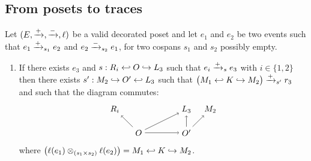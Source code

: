 \subsection{From posets to traces}
%

%


\begin{lemma}
  \label{lem:update_dec}
  Let $(E,\mathrel{\xrightarrow{+}},\mathrel{\xrightarrow{-}},\ell)$ be a valid decorated poset and let $e_1$ and $e_2$ be two events such that $e_1\mathrel{\xrightarrow{+}}_{s_1} e_2$ and $e_2\mathrel{\xrightarrow{-}}_{s_2} e_1$, for two cospans $s_1$ and $s_2$ possibly empty.
  \begin{enumerate}
  \item If there exists $e_3$ and $s:R_i\hookleftarrow O \hookrightarrow L_3$ such that $e_i\mathrel{\xrightarrow{+}}_s e_3$ with $i\in\{1,2\}$ then there exists $s':M_2\hookrightarrow O'\hookleftarrow L_3$ such that $\big( M_1\hookleftarrow K\hookrightarrow M_2\big)\mathrel{\xrightarrow{+}}_{s'} r_3$ and such that the diagram commutes:
    \[
    \begin{tikzpicture} %
      \node (ri) at (-1,1) {\(R_i\)};
      \node (m2) at (3,1) {\(M_2\)};
      \node (l3) at (2,1) {\(L_3\)};
      \node (o) at (0,0) {\(O\)};
      \node (o1) at (2,0) {\(O'\)};
      \draw [->] (o) -- (o1);
      \draw [->] (o) -- (l3);
      \draw [->] (o1) -- (l3);
      \draw [->] (o) -- (ri);
      \draw [->] (o1) -- (m2);
    \end{tikzpicture}
    \]
    where $\big(\ell(e_1)\otimes_{(s_1\times s_2)} \ell(e_2)\big) = M_1\hookleftarrow K\hookrightarrow M_2$.

\end{enumerate}
\end{lemma}

